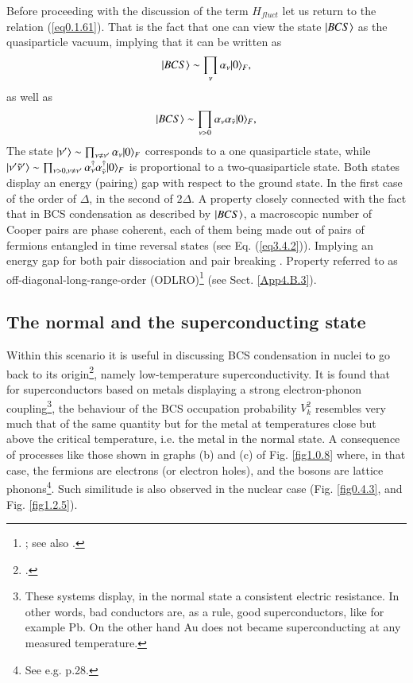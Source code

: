 Before proceeding with the discussion of the term $H_{fluct}$ let us return to the relation (\ref{eq0.1.61}). That is the fact that one can view the state $|{BCS} \rangle$ as the quasiparticle vacuum, implying  that it can be written as
\begin{align}\label{eq1.4.57}
|{BCS} \rangle\sim\prod_{\nu}\alpha_\nu|{0} \rangle_F,
\end{align}
as well as
\begin{align}\label{eq1.4.58}
|{BCS} \rangle\sim\prod_{\nu>0}\alpha_\nu\alpha_{\tilde\nu}|{0} \rangle_F,
\end{align}
The state $|{\nu'} \rangle\sim\prod_{\nu\neq\nu'}\alpha_\nu|{0} \rangle_F$ corresponds to a one quasiparticle state, while $|{\nu'\tilde\nu'} \rangle\sim\prod_{\nu>0,\nu\neq\nu'}\alpha_\nu^\dagger\alpha_{\tilde\nu}^\dagger|{0} \rangle_F$ is proportional to a two-quasiparticle state. Both states display an energy (pairing) gap with respect to the ground state. In the first case of the order of $\Delta$, in the second of $2\Delta$. A property closely connected with the fact that in BCS condensation as described by $|{BCS} \rangle$, a macroscopic number of Cooper pairs  
 are phase coherent,  each of them  being made out of pairs of fermions entangled in time reversal states (see Eq. (\ref{eq3.4.2})). Implying an energy gap for both pair dissociation  and  pair breaking 
 . Property referred to as off-diagonal-long-range-order (ODLRO)\footnote{\label{f37c1} \cite{Penrose:51,Penrose:56,Yang:62}; see also \cite{Anderson:96}.} (see Sect. \ref{App4.B.3}).

\subsection{The normal and the superconducting state}\label{S1.4.3}
 Within this scenario it is useful in discussing BCS condensation in nuclei to go back to its origin\footnote{\cite{Bohr:58}.}, namely low-temperature superconductivity. It is found that for superconductors based on metals displaying a strong electron-phonon coupling\footnote{These systems display, in the normal state a consistent electric resistance. In other words, bad conductors are, as a rule, good superconductors, like for example Pb. On the other hand Au does not became superconducting at any measured temperature.}, the behaviour of the BCS occupation probability $V^2_k$ resembles very much that of the same quantity but for the metal at temperatures close but above the critical temperature, i.e. the metal in the normal state. A consequence of processes like those shown in graphs (b) and (c) of Fig. \ref{fig1.0.8} where, in that case, the fermions are electrons (or electron holes), and the bosons are lattice phonons\footnote{See e.g. \cite{Tinkham:96} p.28.}. Such similitude is also observed in the nuclear case (Fig. \ref{fig0.4.3}, and Fig. \ref{fig1.2.5}). 
 
